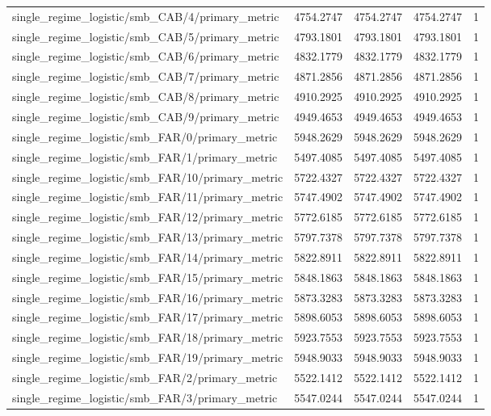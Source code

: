 \begin{table}[h]
\begin{tabular}{lrrrr}
single_regime_logistic/smb_CAB/4/primary_metric & 4754.2747 & 4754.2747 & 4754.2747 & 1 \\
single_regime_logistic/smb_CAB/5/primary_metric & 4793.1801 & 4793.1801 & 4793.1801 & 1 \\
single_regime_logistic/smb_CAB/6/primary_metric & 4832.1779 & 4832.1779 & 4832.1779 & 1 \\
single_regime_logistic/smb_CAB/7/primary_metric & 4871.2856 & 4871.2856 & 4871.2856 & 1 \\
single_regime_logistic/smb_CAB/8/primary_metric & 4910.2925 & 4910.2925 & 4910.2925 & 1 \\
single_regime_logistic/smb_CAB/9/primary_metric & 4949.4653 & 4949.4653 & 4949.4653 & 1 \\
single_regime_logistic/smb_FAR/0/primary_metric & 5948.2629 & 5948.2629 & 5948.2629 & 1 \\
single_regime_logistic/smb_FAR/1/primary_metric & 5497.4085 & 5497.4085 & 5497.4085 & 1 \\
single_regime_logistic/smb_FAR/10/primary_metric & 5722.4327 & 5722.4327 & 5722.4327 & 1 \\
single_regime_logistic/smb_FAR/11/primary_metric & 5747.4902 & 5747.4902 & 5747.4902 & 1 \\
single_regime_logistic/smb_FAR/12/primary_metric & 5772.6185 & 5772.6185 & 5772.6185 & 1 \\
single_regime_logistic/smb_FAR/13/primary_metric & 5797.7378 & 5797.7378 & 5797.7378 & 1 \\
single_regime_logistic/smb_FAR/14/primary_metric & 5822.8911 & 5822.8911 & 5822.8911 & 1 \\
single_regime_logistic/smb_FAR/15/primary_metric & 5848.1863 & 5848.1863 & 5848.1863 & 1 \\
single_regime_logistic/smb_FAR/16/primary_metric & 5873.3283 & 5873.3283 & 5873.3283 & 1 \\
single_regime_logistic/smb_FAR/17/primary_metric & 5898.6053 & 5898.6053 & 5898.6053 & 1 \\
single_regime_logistic/smb_FAR/18/primary_metric & 5923.7553 & 5923.7553 & 5923.7553 & 1 \\
single_regime_logistic/smb_FAR/19/primary_metric & 5948.9033 & 5948.9033 & 5948.9033 & 1 \\
single_regime_logistic/smb_FAR/2/primary_metric & 5522.1412 & 5522.1412 & 5522.1412 & 1 \\
single_regime_logistic/smb_FAR/3/primary_metric & 5547.0244 & 5547.0244 & 5547.0244 & 1 \\

\end{tabular}
\end{table}
